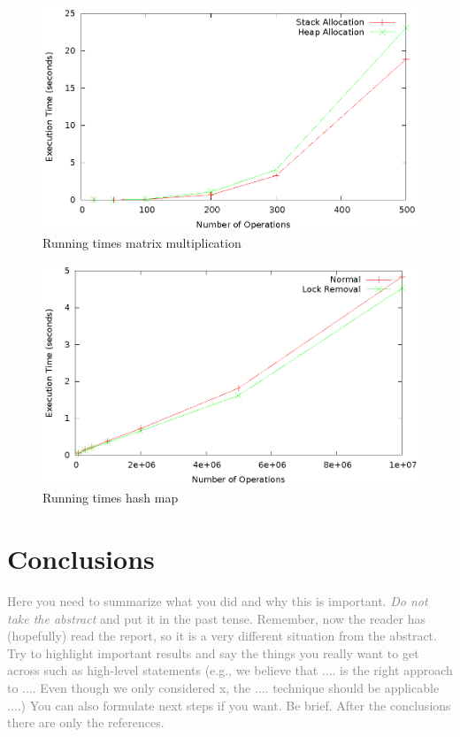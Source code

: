 \documentclass[letterpaper]{article}
\begin{document}
\begin{figure} \center
 \includegraphics[width=0.8\linewidth]{results_matrix_mul.eps}
  \caption{Running times matrix multiplication}
  \label{fig:matrixmul}
\end{figure}

\begin{figure} \center
 \includegraphics[width=0.8\linewidth]{results_hash.eps}
  \caption{Running times hash map}
  \label{fig:hash}
\end{figure}

\section{Conclusions}

\textcolor{gray}{
Here you need to summarize what you did and why this is
important. {\em Do not take the abstract} and put it in the past
tense. Remember, now the reader has (hopefully) read the report, so it
is a very different situation from the abstract. Try to highlight
important results and say the things you really want to get across
such as high-level statements (e.g., we believe that .... is the right
approach to .... Even though we only considered x, the
.... technique should be applicable ....) You can also formulate next
steps if you want. Be brief. After the conclusions there are only the references.
}



\end{document}
